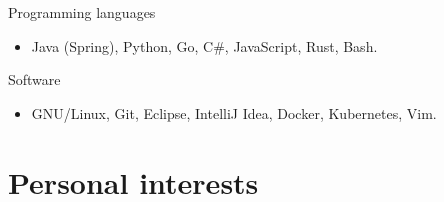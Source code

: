 \documentclass{res}
\newcommand{\inFrench}[1]{}
\newcommand{\inEnglish}[1]{#1}
\begin{document}
\begin{resume}
%

\inEnglish{
	Programming languages
	\vspace{0.05in}
	\begin{itemize}
		\item Java (Spring), Python, Go, C\#, JavaScript, Rust, Bash.
	\end{itemize}

	Software
	\vspace{0.05in}
	\begin{itemize}
		\item GNU/Linux, Git, Eclipse, IntelliJ Idea, Docker, Kubernetes, Vim.
	\end{itemize}
}


\inFrench{
	\section{Intérêts personnels}
}
\inEnglish{
	\section{Personal interests}
}
\vspace{6pt}



\end{resume}
\end{document}
